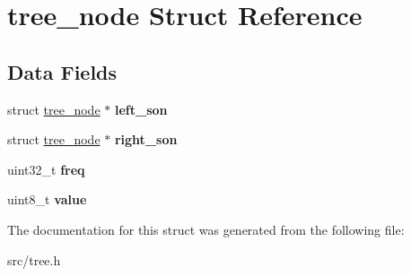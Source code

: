 \hypertarget{structtree__node}{}\section{tree\+\_\+node Struct Reference}
\label{structtree__node}
\subsection*{Data Fields}
\begin{DoxyCompactItemize}
\item 
struct \hyperlink{structtree__node}{tree\+\_\+node} $\ast$ {\bfseries left\+\_\+son}\hypertarget{structtree__node_a9fab146f0a8a8fcc73bc6d6082bda0a8}{}\label{structtree__node_a9fab146f0a8a8fcc73bc6d6082bda0a8}

\item 
struct \hyperlink{structtree__node}{tree\+\_\+node} $\ast$ {\bfseries right\+\_\+son}\hypertarget{structtree__node_a852cc2bc3e5863b0c812b9f21dcd9b2a}{}\label{structtree__node_a852cc2bc3e5863b0c812b9f21dcd9b2a}

\item 
uint32\+\_\+t {\bfseries freq}\hypertarget{structtree__node_aacfad457f5366fa9265eb0a89e43f23b}{}\label{structtree__node_aacfad457f5366fa9265eb0a89e43f23b}

\item 
uint8\+\_\+t {\bfseries value}\hypertarget{structtree__node_a638e4503e0ae6ce655b7ad2e17e8f0ad}{}\label{structtree__node_a638e4503e0ae6ce655b7ad2e17e8f0ad}

\end{DoxyCompactItemize}


The documentation for this struct was generated from the following file\+:\begin{DoxyCompactItemize}
\item 
src/tree.\+h\end{DoxyCompactItemize}
